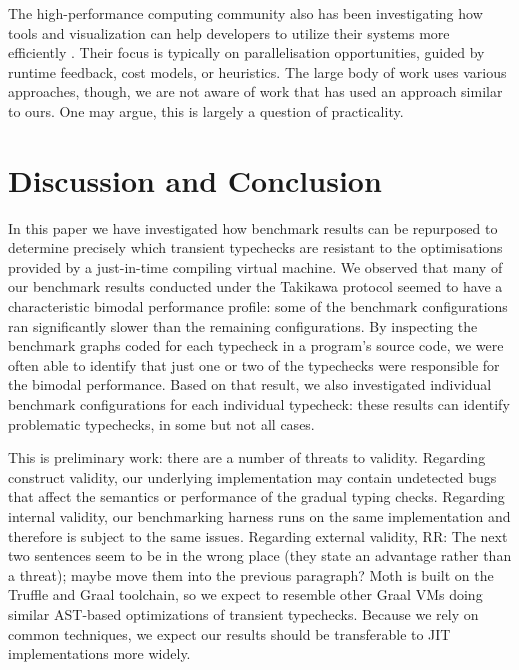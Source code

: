\documentclass[sigplan,10pt,review,screen]{acmart}\settopmatter{printfolios=true}
\newcommand{\RR}[1]{{\color{red}RR: #1}}
\begin{document}
The high-performance computing community also has been investigating how
tools and visualization can help developers to utilize their systems
more efficiently \citep{Papenhausen:2016:IVT,daSilva:2019:PSV}.
Their focus is typically on parallelisation opportunities,
guided by runtime feedback, cost models, or heuristics. 
The large body of work \citep{Isaacs:2014:PerfViz} uses various approaches,
though, we are not aware of work that has used an approach similar to ours.
One may argue, this is largely a question of practicality.



\section{Discussion and Conclusion}
\label{s-concl}

In this paper we have investigated how benchmark results can be
repurposed to determine precisely which transient typechecks are
resistant to the optimisations provided by a just-in-time compiling
virtual machine.  We observed that many of our benchmark results
conducted under the Takikawa protocol 
seemed to have a characteristic bimodal performance profile: some
of the benchmark configurations ran significantly slower than
the remaining configurations. By inspecting the benchmark graphs coded
for each typecheck in a program's source code, we were often able to
identify that just one or two of the typechecks were responsible for
the bimodal performance.  Based on that result, we also investigated
individual benchmark configurations for each individual typecheck:
these results can identify problematic typechecks, in some but not all cases. 

This is preliminary work: there are a number of threats to validity. 
Regarding construct validity, 
our underlying
implementation may contain undetected bugs that affect the semantics
or performance of the gradual typing checks. Regarding internal
validity,
our benchmarking harness runs on the same implementation
and therefore is subject to the same issues.
Regarding external validity, 
\RR{The next two sentences seem to be in the wrong place (they state an advantage rather than a threat); maybe move them into the previous paragraph?}
Moth is built
on the Truffle and Graal toolchain, so we expect
to resemble other Graal
VMs doing similar AST-based optimizations of transient typechecks.
Because we rely on common techniques, 
we expect our results should be transferable to JIT implementations
more widely.
\end{document}
